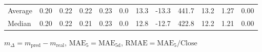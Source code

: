 \begin{threeparttable}
{\begin{tabular}{lrrrrrrrrrrr}
Average &          0.20 &          0.22 &          0.22 &        0.23 &                 0.0 &                13.3 &      -13.3 &               441.7 &             13.2 &            1.27 &                   0.00 \\
 Median &          0.20 &          0.22 &          0.21 &        0.23 &                 0.0 &                12.8 &      -12.7 &               422.8 &             12.2 &            1.21 &                   0.00 \\
\bottomrule
\end{tabular}
}
\begin{tablenotes}\footnotesize
\item $m_\Delta=m_{\text{pred}}-m_{\text{real}}$,
$\mathrm{MAE}_5=\mathrm{MAE}_{5\text{d}}$,
$\mathrm{RMAE}=\mathrm{MAE}_5/\text{Close}$
\end{tablenotes}
\end{threeparttable}
\endgroup

